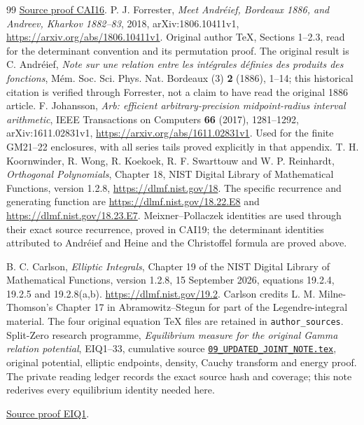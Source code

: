 \documentclass[11pt]{article}
\begin{document}
\begin{thebibliography}{99}
\href{https://github.com/KokunoYumeto/zeta-function-research-reader/blob/5992ad50c0f2a06921f1fcaded7b4e38097c0739/workbenches/splitzero-tandem/continuations/20260920-original-kernel-mixed-determinants/cumulative/09_UPDATED_JOINT_NOTE.tex\#L63199}{Source proof CAI16}.
 P. J. Forrester, \emph{Meet Andr\'eief, Bordeaux 1886,
and Andreev, Kharkov 1882--83}, 2018, arXiv:1806.10411v1,
\url{https://arxiv.org/abs/1806.10411v1}. Original author TeX, Sections
1--2.3, read for the determinant convention and its permutation proof.
The original result is C. Andr\'eief, \emph{Note sur une relation entre
les int\'egrales d\'efinies des produits des fonctions},
M\'em. Soc. Sci. Phys. Nat. Bordeaux (3) \textbf{2} (1886), 1--14;
this historical citation is verified through Forrester, not a claim
to have read the original 1886 article.
 F. Johansson, \emph{Arb: efficient arbitrary-precision
midpoint-radius interval arithmetic}, IEEE Transactions on Computers
\textbf{66} (2017), 1281--1292, arXiv:1611.02831v1,
\url{https://arxiv.org/abs/1611.02831v1}. Used for the finite GM21--22
enclosures, with all series tails proved explicitly in that appendix.
 T. H. Koornwinder, R. Wong, R. Koekoek,
R. F. Swarttouw and W. P. Reinhardt, \emph{Orthogonal Polynomials},
Chapter 18, NIST Digital Library of Mathematical Functions, version 1.2.8,
\url{https://dlmf.nist.gov/18}. The specific recurrence and generating
function are \url{https://dlmf.nist.gov/18.22.E8} and
\url{https://dlmf.nist.gov/18.23.E7}.
Meixner--Pollaczek identities are used through their exact source
recurrence, proved in CAI19; the determinant identities attributed to
Andr\'eief and Heine and the Christoffel formula are proved above.


 B. C. Carlson, \emph{Elliptic Integrals}, Chapter 19 of
the NIST Digital Library of Mathematical Functions, version 1.2.8,
15 September 2026, equations 19.2.4, 19.2.5 and 19.2.8(a,b).
\url{https://dlmf.nist.gov/19.2}. Carlson credits L. M. Milne-Thomson's
Chapter 17 in Abramowitz--Stegun for part of the Legendre-integral material.
The four original equation TeX files are retained in \texttt{author\_sources}.
 Split-Zero research programme, \emph{Equilibrium measure for
the original Gamma relation potential}, EIQ1--33, cumulative source
\href{https://github.com/KokunoYumeto/zeta-function-research-reader/blob/5992ad50c0f2a06921f1fcaded7b4e38097c0739/workbenches/splitzero-tandem/continuations/20260920-original-kernel-mixed-determinants/cumulative/09_UPDATED_JOINT_NOTE.tex\#L1}{\texttt{09\_UPDATED\_JOINT\_NOTE.tex}}, original potential, elliptic endpoints,
density, Cauchy transform and energy proof. The private reading ledger
records the exact source hash and coverage; this note rederives every
equilibrium identity needed here.


\href{https://github.com/KokunoYumeto/zeta-function-research-reader/blob/5992ad50c0f2a06921f1fcaded7b4e38097c0739/workbenches/splitzero-tandem/continuations/20260920-original-kernel-mixed-determinants/cumulative/09_UPDATED_JOINT_NOTE.tex\#L4386}{Source proof EIQ1}.
\end{thebibliography}
\end{document}
